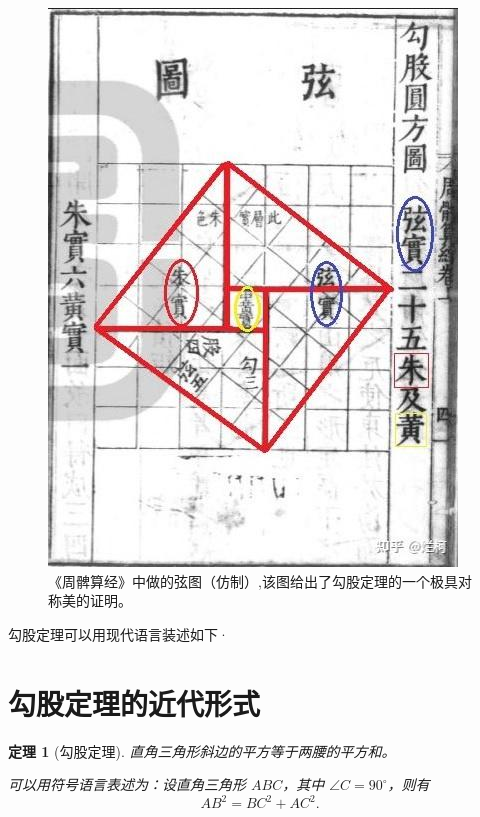 \documentclass[UTF8]{ctexart}
\newtheorem{thm}{定理} %
\begin{document}
\begin{figure}[H]
\centering %
\includegraphics[scale=0.5]{images/xiantu.png}%
\caption{《周髀算经》中做的弦图（仿制）,该图给出了勾股定理的一个极具对称美的证明。
\label{fig:xiantu}}%
\end{figure}    %

勾股定理可以用现代语言装述如下·
\section{勾股定理的近代形式}%
\begin{thm}[勾股定理] 

直角三角形斜边的平方等于两腰的平方和。
\par 可以用符号语言表述为：设直角三角形 $ABC$，其中 $\angle C = 90^\circ$，则有
\begin{equation}
\label{eq:gougu} %
AB^2 = BC^2 + AC^2.
\end{equation} %
\end{thm} %
 
\end{document}
